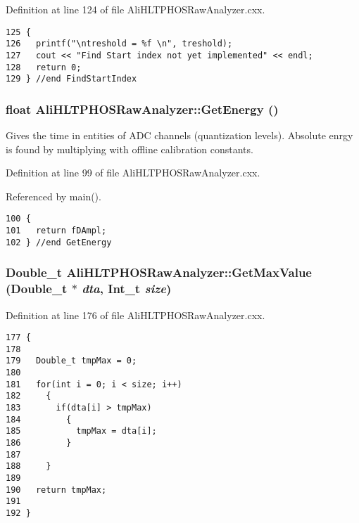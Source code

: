 Definition at line 124 of file Ali\-HLTPHOSRaw\-Analyzer.cxx.

\footnotesize\begin{verbatim}125 {
126   printf("\ntreshold = %f \n", treshold);
127   cout << "Find Start index not yet implemented" << endl;
128   return 0;
129 } //end FindStartIndex
\end{verbatim}\normalsize 


\subsubsection{\setlength{\rightskip}{0pt plus 5cm}float Ali\-HLTPHOSRaw\-Analyzer::Get\-Energy ()\hspace{0.3cm}{\tt  [inherited]}}\label{classAliHLTPHOSRawAnalyzer_AliHLTPHOSRawAnalyzerPeakFindera11}


Gives the time in entities of ADC channels (quantization levels). Absolute enrgy is found by multiplying with offline calibration constants. 

Definition at line 99 of file Ali\-HLTPHOSRaw\-Analyzer.cxx.

Referenced by main().

\footnotesize\begin{verbatim}100 {
101   return fDAmpl;
102 } //end GetEnergy
\end{verbatim}\normalsize 


\subsubsection{\setlength{\rightskip}{0pt plus 5cm}Double\_\-t Ali\-HLTPHOSRaw\-Analyzer::Get\-Max\-Value (Double\_\-t $\ast$ {\em dta}, Int\_\-t {\em size})\hspace{0.3cm}{\tt  [inherited]}}\label{classAliHLTPHOSRawAnalyzer_AliHLTPHOSRawAnalyzerPeakFindera18}




Definition at line 176 of file Ali\-HLTPHOSRaw\-Analyzer.cxx.

\footnotesize\begin{verbatim}177 {
178 
179   Double_t tmpMax = 0;
180 
181   for(int i = 0; i < size; i++)
182     {
183       if(dta[i] > tmpMax)
184         {
185           tmpMax = dta[i];
186         }
187 
188     }
189   
190   return tmpMax;
191 
192 }
\end{verbatim}\normalsize 


